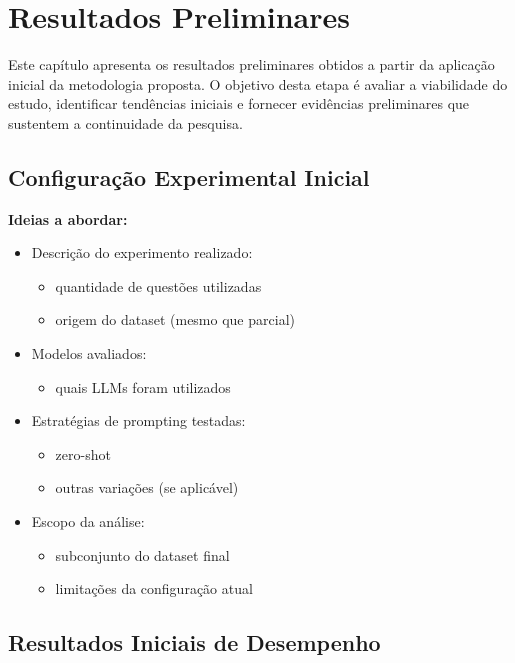 \chapter{Resultados Preliminares}
\label{sec:resultados}

Este capítulo apresenta os resultados preliminares obtidos a partir da aplicação inicial da metodologia proposta. O objetivo desta etapa é avaliar a viabilidade do estudo, identificar tendências iniciais e fornecer evidências preliminares que sustentem a continuidade da pesquisa.

\section{Configuração Experimental Inicial}
\label{subsec:config_preliminar}

\textbf{Ideias a abordar:}
\begin{itemize}
    \item Descrição do experimento realizado:
    \begin{itemize}
        \item quantidade de questões utilizadas
        \item origem do dataset (mesmo que parcial)
    \end{itemize}
    \item Modelos avaliados:
    \begin{itemize}
        \item quais LLMs foram utilizados
    \end{itemize}
    \item Estratégias de prompting testadas:
    \begin{itemize}
        \item zero-shot
        \item outras variações (se aplicável)
    \end{itemize}
    \item Escopo da análise:
    \begin{itemize}
        \item subconjunto do dataset final
        \item limitações da configuração atual
    \end{itemize}
\end{itemize}

\section{Resultados Iniciais de Desempenho}
\label{subsec:desempenho_inicial}

